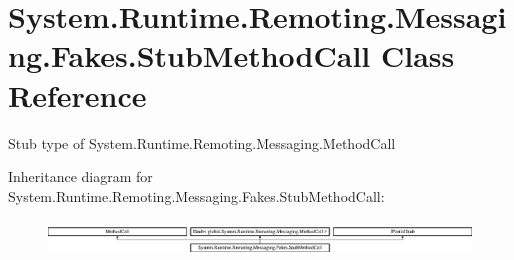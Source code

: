 \hypertarget{class_system_1_1_runtime_1_1_remoting_1_1_messaging_1_1_fakes_1_1_stub_method_call}{\section{System.\-Runtime.\-Remoting.\-Messaging.\-Fakes.\-Stub\-Method\-Call Class Reference}
\label{class_system_1_1_runtime_1_1_remoting_1_1_messaging_1_1_fakes_1_1_stub_method_call}
}


Stub type of System.\-Runtime.\-Remoting.\-Messaging.\-Method\-Call 


Inheritance diagram for System.\-Runtime.\-Remoting.\-Messaging.\-Fakes.\-Stub\-Method\-Call\-:\begin{figure}[H]
\begin{center}
\leavevmode
\includegraphics[height=0.967185cm]{class_system_1_1_runtime_1_1_remoting_1_1_messaging_1_1_fakes_1_1_stub_method_call}
\end{center}
\end{figure}
